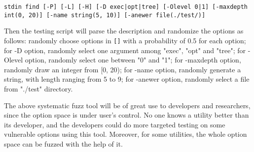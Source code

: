 \texttt{stdin find [-P] [-L] [-H] [-D exec|opt|tree] [-Olevel 0|1] [-maxdepth int(0, 20)] [-name string(5, 10)] [-anewer file(./test/)]}

Then the testing script will parse the description and randomize the options as follows: randomly choose options in \texttt{[]} with a probability of 0.5 for each option; for -D option, randomly select one argument among "exec", "opt" and "tree"; for -Olevel option, randomly select one between "0" and "1"; for -maxdepth option, randomly draw an integer from [0, 20); for -name option, randomly generate a string, with length ranging from 5 to 9; for -anewer option, randomly select a file from "./test" directory.

The above systematic fuzz tool will be of great use to developers and researchers, since the option space is under user's control. No one knows a utility better than its developer, and the developers could do more targeted testing on some vulnerable options using this tool. Moreover, for some utilities, the whole option space can be fuzzed with the help of it.
